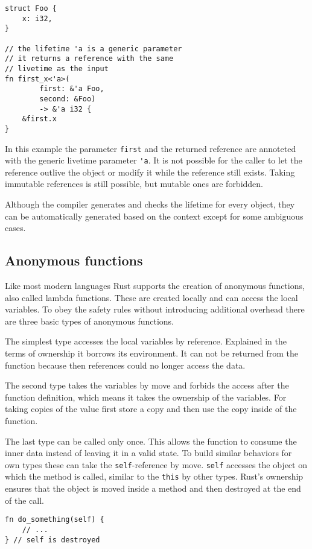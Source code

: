 \documentclass[conference,twocolumn]{IEEEtran}
\begin{document}
\begin{lstlisting}[frame=single]
struct Foo {
    x: i32,
}

// the lifetime 'a is a generic parameter
// it returns a reference with the same 
// livetime as the input
fn first_x<'a>(
        first: &'a Foo,
        second: &Foo)
        -> &'a i32 {
    &first.x
}
\end{lstlisting}
In this example the parameter \verb|first| and the returned reference are annoteted with the generic livetime parameter \verb|'a|. It is not possible for the caller to let the reference outlive the object or modify it while the reference still exists. Taking immutable references is still possible, but mutable ones are forbidden.

Although the compiler generates and checks the lifetime for every object, they can be automatically generated based on the context except for some ambiguous cases.

\subsection{Anonymous functions}
Like most modern languages Rust supports the creation of anonymous functions, also called lambda functions. These are created locally and can access the local variables. To obey the safety rules without introducing additional overhead there are three basic types of anonymous functions.

The simplest type accesses the local variables by reference. Explained in the terms of ownership it borrows its environment. It can not be returned from the function because then references could no longer access the data.

The second type takes the variables by move and forbids the access after the function definition, which means it takes the ownership of the variables. For taking copies of the value first store a copy and then use the copy inside of the function.

The last type can be called only once. This allows the function to consume the inner data instead of leaving it in a valid state. To build similar behaviors for own types these can take the \verb|self|-reference by move. \verb|self| accesses the object on which the method is called, similar to the \verb|this| by other types. Rust's ownership ensures that the object is moved inside a method and then destroyed at the end of the call. \cite{RustBook}
\begin{lstlisting}[frame=single]
fn do_something(self) {
    // ...
} // self is destroyed
\end{lstlisting}
\end{document}
